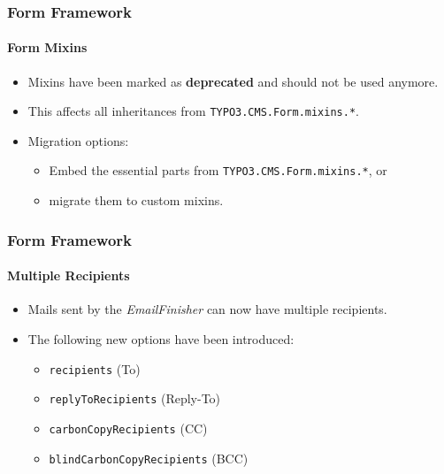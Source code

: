 
\begin{frame}[fragile]
	\frametitle{Form Framework}
	\framesubtitle{Form Mixins}

	\begin{itemize}
		\item Mixins have been marked as \textbf{deprecated} and should not be used anymore.
		\item This affects all inheritances from \texttt{TYPO3.CMS.Form.mixins.*}.
		\item Migration options:

			\begin{itemize}
				\item Embed the essential parts from \texttt{TYPO3.CMS.Form.mixins.*}, or
				\item migrate them to custom mixins.
			\end{itemize}

	\end{itemize}

\end{frame}


\begin{frame}[fragile]
	\frametitle{Form Framework}
	\framesubtitle{Multiple Recipients}

	\begin{itemize}
		\item Mails sent by the \textit{EmailFinisher} can now have multiple recipients.

		\item The following new options have been introduced:

			\begin{itemize}
				\item \texttt{recipients} (To)
				\item \texttt{replyToRecipients} (Reply-To)
				\item \texttt{carbonCopyRecipients} (CC)
				\item \texttt{blindCarbonCopyRecipients} (BCC)
			\end{itemize}

	\end{itemize}

\end{frame}

